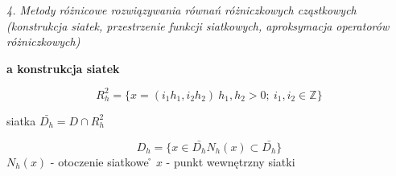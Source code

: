 \textit{4. Metody różnicowe rozwiązywania równań różniczkowych cząstkowych (konstrukcja siatek, przestrzenie funkcji siatkowych, aproksymacja operatorów różniczkowych)}

\textbf{a\) konstrukcja siatek}

\[R^{2}_{h} = \{ x = (i_{1}h_{1}, i_{2}h_{2})\ h_{1},h_{2} > 0;\ i_{1},i_{2} \in \mathbb{Z}\}\]

siatka $\bar{D_{h}} = D \cap R^{2}_{h}$

\[D_{h} = \{ x \in \bar{D_{h}} N_h(x) \subset \bar{D_{h}}\}\]
$N_h(x)$ - otoczenie siatkowe \n\r
$x$ - punkt wewnętrzny siatki